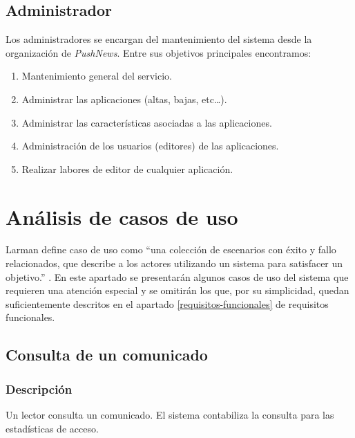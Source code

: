 \subsection{Administrador}
Los administradores se encargan del mantenimiento del sistema desde la organización de \emph{PushNews}. Entre sus objetivos principales encontramos:
\begin{enumerate}
    \item Mantenimiento general del servicio.
    \item Administrar las aplicaciones (altas, bajas, etc\dots).
    \item Administrar las características asociadas a las aplicaciones.
    \item Administración de los usuarios (editores) de las aplicaciones. 
    \item Realizar labores de editor de cualquier aplicación.
\end{enumerate}

\section{Análisis de casos de uso}
Larman define caso de uso como ``una colección de escenarios con éxito y fallo relacionados, que describe a los actores utilizando un sistema para satisfacer un objetivo.'' \cite{Larman2004}. En este apartado se presentarán algunos casos de uso del sistema que requieren una atención especial y se omitirán los que, por su simplicidad, quedan suficientemente descritos en el apartado \ref{requisitos-funcionales} de requisitos funcionales.

\subsection{Consulta de un comunicado}

\subsubsection*{Descripción}
Un lector consulta un comunicado. El sistema contabiliza la consulta para las estadísticas de acceso.

